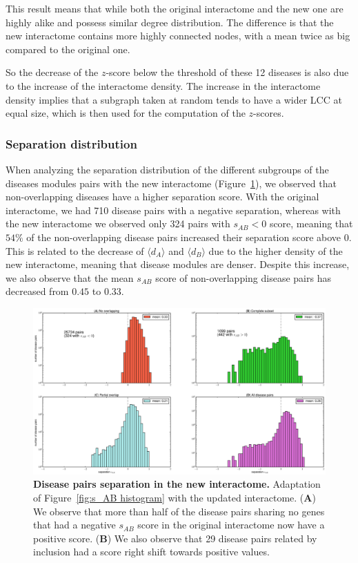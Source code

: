 \documentclass[letterpaper]{article}
\begin{document}
	This result means that while both the original interactome and the new one are highly alike and possess
	similar degree distribution. The difference is that the new interactome contains more highly connected
	nodes, with a mean twice as big compared to the original one.

	So the decrease of the $z$-score below the threshold of these 12 diseases is also due to the increase of
	the interactome density. The increase in the interactome density implies that a subgraph taken at random
	tends to have a wider LCC at equal size, which is then used for the computation of the $z$-scores.

\subsubsection{Separation distribution}
	When analyzing the separation distribution of the different subgroups of the diseases modules pairs with
	the new interactome (Figure~\ref{fig:new interactome s_AB}), we observed that non-overlapping diseases have
	a higher separation score. With the original interactome, we had 710 disease pairs with a negative separation,
	whereas with the new interactome we observed only 324 pairs with $s_{AB} < 0$ score, meaning that
	$54\%$ of the non-overlapping disease pairs increased their separation score above 0. This is related to the
	decrease of $\langle d_A \rangle$ and $\langle d_B \rangle$ due to the higher density of the new interactome,
	meaning that disease modules are denser.
	Despite this increase, we also observe that the mean $s_{AB}$ score of non-overlapping disease pairs has
	decreased from $0.45$ to $0.33$.

	\begin{figure}[!t]
		\hspace{-2.2cm}
		\vspace{-1cm}
		\includegraphics[scale=.36]{images/new_interactome_s_AB_histogram.eps}
		\caption{{\bf Disease pairs separation in the new interactome.} Adaptation of Figure~\ref{fig:s_AB histogram} with the
		updated interactome.
		({\bf A}) We observe that more than half of the disease pairs sharing no genes that had a negative $s_{AB}$ score
		in the original interactome now have a positive score.
		({\bf B}) We also observe that 29 disease pairs related by inclusion had a score right shift towards positive values.
		\label{fig:new interactome s_AB}}
		\vspace{-.7cm}
	\end{figure}
\end{document}
